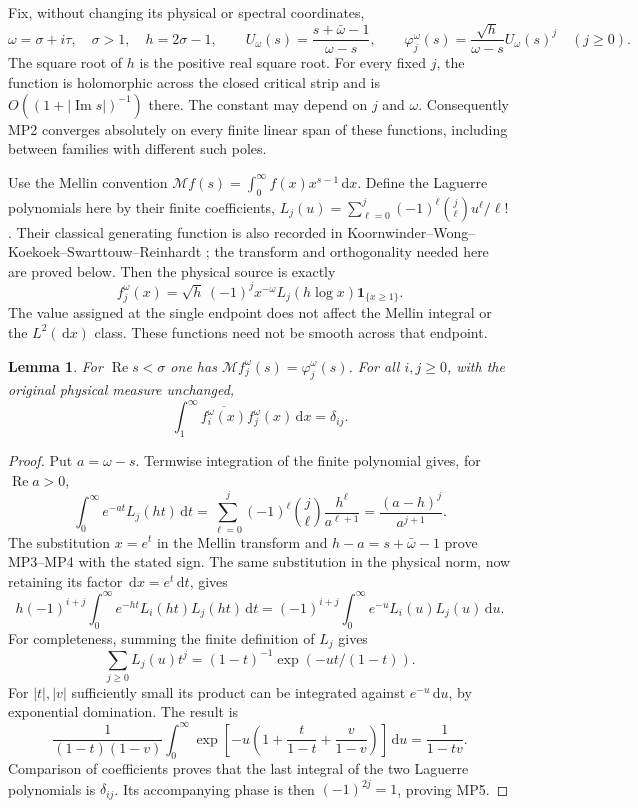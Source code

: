 \documentclass[11pt]{article}
\newtheorem{lemma}[theorem]{Lemma}
\newcommand{\dd}{\,\mathrm d}
\newcommand{\Rea}{\operatorname{Re}}
\newcommand{\Ima}{\operatorname{Im}}
\begin{document}
Fix, without changing its physical or spectral coordinates,
\begin{equation}
 \omega=\sigma+i\tau,\quad \sigma>1,\quad h=2\sigma-1,
 \qquad U_\omega(s)=\frac{s+\bar\omega-1}{\omega-s},\qquad
 \varphi_j^\omega(s)=\frac{\sqrt h}{\omega-s}U_\omega(s)^j
 \quad(j\geq0).\tag{MP3}
\end{equation}
The square root of $h$ is the positive real square root. For every fixed
$j$, the function is holomorphic across the closed critical strip and is
$O((1+|\Ima s|)^{-1})$ there. The constant may depend on $j$ and $\omega$.
Consequently MP2 converges absolutely on every finite linear span of
these functions, including between families with different such poles.

Use the Mellin convention $\mathcal Mf(s)=\int_0^\infty f(x)x^{s-1}\dd x$.
Define the Laguerre polynomials here by their finite coefficients,
$L_j(u)=\sum_{\ell=0}^j(-1)^\ell\binom j\ell u^\ell/\ell!$.
Their classical generating function is also recorded in
Koornwinder--Wong--Koekoek--Swarttouw--Reinhardt \cite{Laguerre};
the transform and orthogonality needed here are proved below.
Then the physical source is exactly
\begin{equation}
 f_j^\omega(x)=\sqrt h\,(-1)^j x^{-\omega}L_j(h\log x)
                    \mathbf1_{\{x\geq1\}}.
 \tag{MP4}
\end{equation}
The value assigned at the single endpoint does not affect the Mellin
integral or the $L^2(\dd x)$ class. These functions need not be smooth
across that endpoint.

\begin{lemma}
For $\Rea s<\sigma$ one has $\mathcal Mf_j^\omega(s)=\varphi_j^\omega(s)$.
For all $i,j\geq0$, with the original physical measure unchanged,
\begin{equation}
 \int_1^\infty\overline{f_i^\omega(x)}f_j^\omega(x)\dd x=\delta_{ij}.
 \tag{MP5}
\end{equation}
\end{lemma}
\begin{proof}
Put $a=\omega-s$. Termwise integration of the finite polynomial gives,
for $\Rea a>0$,
\[
 \int_0^\infty e^{-at}L_j(ht)\dd t
 =\sum_{\ell=0}^j(-1)^\ell\binom j\ell\frac{h^\ell}{a^{\ell+1}}
 =\frac{(a-h)^j}{a^{j+1}}.
\]
The substitution $x=e^t$ in the Mellin transform and
$h-a=s+\bar\omega-1$ prove MP3--MP4 with the stated sign.
The same substitution in the physical norm, now retaining its factor
$\dd x=e^t\dd t$, gives
\[
 h(-1)^{i+j}\int_0^\infty e^{-ht}L_i(ht)L_j(ht)\dd t
 =(-1)^{i+j}\int_0^\infty e^{-u}L_i(u)L_j(u)\dd u.
\]
For completeness, summing the finite definition of $L_j$ gives
\[
\sum_{j\geq0}L_j(u)t^j=(1-t)^{-1}\exp(-ut/(1-t)).
\]
For $|t|,|v|$ sufficiently small its product can be integrated against
$e^{-u}\dd u$, by exponential domination. The result is
\[
 \frac1{(1-t)(1-v)}
 \int_0^\infty\exp\left[-u\left(1+\frac t{1-t}
                         +\frac v{1-v}\right)\right]\dd u
 =\frac1{1-tv}.
\]
Comparison of coefficients proves that the last integral of the two
Laguerre polynomials is $\delta_{ij}$. Its accompanying phase is then
$(-1)^{2j}=1$, proving MP5.
\end{proof}
\end{document}
